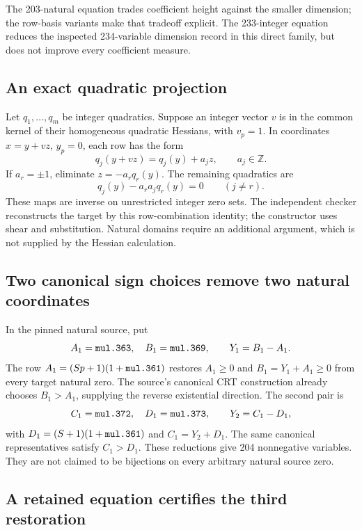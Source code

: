 \documentclass[11pt]{article}
\theoremstyle{remark}\newtheorem{remark}[theorem]{Remark}
\newcommand{\Z}{\mathbb Z}\newcommand{\N}{\mathbb N}
\newcommand{\code}[1]{\texttt{\detokenize{#1}}}
\begin{document}

The 203-natural equation trades coefficient height against the smaller
dimension; the row-basis variants make that tradeoff explicit. The
233-integer equation reduces the inspected 234-variable dimension record
in this direct family, but does not improve every coefficient measure.

\subsection{An exact quadratic projection}

Let $q_1,\ldots,q_m$ be integer quadratics. Suppose an integer vector $v$
is in the common kernel of their homogeneous quadratic Hessians, with
$v_p=1$. In coordinates $x=y+vz$, $y_p=0$, each row has the form
\[
 q_j(y+vz)=q_j(y)+a_jz,
 \qquad a_j\in\Z.
\]
If $a_r=\pm1$, eliminate $z=-a_rq_r(y)$. The remaining quadratics are
\[
 q_j(y)-a_ra_jq_r(y)=0\qquad(j\ne r).
\]
These maps are inverse on unrestricted integer zero sets. The independent
checker reconstructs the target by this row-combination identity; the
constructor uses shear and substitution. Natural domains require an
additional argument, which is not supplied by the Hessian calculation.

\subsection{Two canonical sign choices remove two natural coordinates}

In the pinned natural source, put
\[
 A_1=\code{mul.363},\quad B_1=\code{mul.369},
 \qquad Y_1=B_1-A_1.
\]
The row $A_1=(Sp+1)(1+\code{mul.361})$ restores $A_1\ge0$ and
$B_1=Y_1+A_1\ge0$ from every target natural zero. The source's canonical
CRT construction already chooses $B_1>A_1$, supplying the reverse
existential direction. The second pair is
\[
 C_1=\code{mul.372},\quad D_1=\code{mul.373},
 \qquad Y_2=C_1-D_1,
\]
with $D_1=(S+1)(1+\code{mul.361})$ and $C_1=Y_2+D_1$.
The same canonical representatives satisfy $C_1>D_1$.
These reductions give 204 nonnegative variables. They are not claimed to
be bijections on every arbitrary natural source zero.

\subsection{A retained equation certifies the third restoration}
\end{document}

